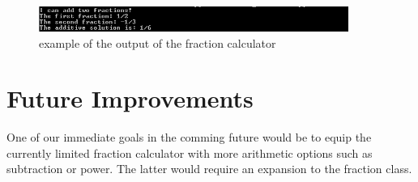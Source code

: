 \documentclass[refman]{scrartcl}
\begin{document}
\begin{figure}[h]
	\centering
		\includegraphics[width=0.9\textwidth]{graphics/calculator_example}
	\caption{example of the output of the fraction calculator}\label{fig:example}
\end{figure}

\section{Future Improvements}

One of our immediate goals in the comming future would be to equip the currently limited fraction calculator with more arithmetic options such as subtraction or power. The latter would require an expansion to the fraction class.
\end{document}
